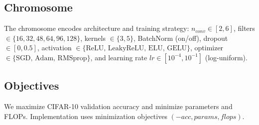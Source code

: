 
\subsection{Chromosome}
The chromosome encodes architecture and training strategy:
$n_{conv}\in[2,6]$, filters $\in\{16,32,48,64,96,128\}$, kernels $\in\{3,5\}$,
BatchNorm (on/off), dropout $\in[0,0.5]$, activation $\in\{\text{ReLU, LeakyReLU, ELU, GELU}\}$,
optimizer $\in\{\text{SGD, Adam, RMSprop}\}$, and learning rate $lr\in[10^{-4},10^{-1}]$ (log-uniform).

\subsection{Objectives}
We maximize CIFAR-10 validation accuracy and minimize parameters and FLOPs.
Implementation uses minimization objectives $(-acc, params, flops)$.

